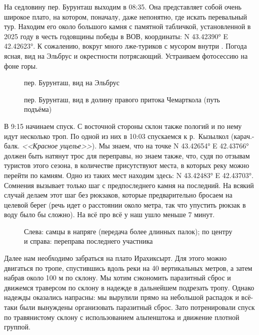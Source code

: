 На седловину пер. Бурунташ выходим в 08:35. Она представляет собой очень широкое плато, на котором, поначалу, даже непонятно, где искать перевальный тур. Находим его около большого камня с памятной табличкой, установленной в 2025 году в честь годовщины победы в ВОВ, координаты: N 43.42390° E 42.42623°. К сожалению, вокруг много лже-туриков с мусором внутри \frownie. Погода ясная, вид на Эльбрус и окрестности потрясающий. Устраиваем фотосессию на фоне горы.

\begin{figure}[h!]
	\centering
	\caption{пер. Бурунташ, вид на Эльбрус}
	\label{fig:buruntash1}
\end{figure}

\begin{figure}[h!]
	\centering
	\caption{пер. Бурунташ, вид в долину правого притока Чемарткола (путь подъёма)}
	\label{fig:buruntash2}
\end{figure}

В 9:15 начинаем спуск. С восточной стороны склон также пологий и по нему идут несколько троп. По одной из них в 10:03  спускаемся к р.~Кызылкол (карач.-балк. \textit{<<Красное ущелье>>}). Мы знаем, что на точке N 43.42654° E 42.43766° должен быть натянут трос для переправы, но знаем также, что, судя по отзывам туристов этого сезона, в количестве присутствуют места, в которых реку можно перейти по камням. Одно из таких мест находим здесь: N 43.42483° E 42.43703°. Сомнения вызывает только шаг с предпоследнего камня на последний. На всякий случай делаем этот шаг без рюкзаков, которые предварительно бросаем на целевой берег (речь идет о расстоянии около метра, так что упустить рюкзак в воду было бы сложно). На всё про всё у наш ушло меньше 7 минут.

\begin{figure}[h!]
	\centering
	\caption{Слева: самцы в напряге (передача более длинных палок); по центру и справа: переправа последнего участника}
	\label{fig:pereprava}
\end{figure}

Далее нам необходимо забраться на плато Ирахиксырт. Для этого можно двигаться по тропе, спустившись вдоль реки на 40 вертикальных метров, а затем набрав около 100 м по склону. Мы хотим сэкономить паразитный сброс и движемся траверсом по склону в надежде в дальнейшем подрезать тропу. Однако надежды оказались напрасны: мы вырулили прямо на небольшой распадок и всё-таки были вынуждены организовать паразитный сброс. Зато потренировали спуск по травянистому склону с использованием альпенштока и движение плотной группой.

